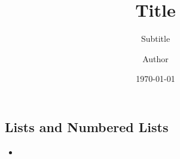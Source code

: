 \documentclass[
	aspectratio=169, %
	8pt, %
]{beamer}
\title[Short Title]{Title} %
\subtitle[Short Subtitle]{Subtitle} %
\author[Short Author]{Author} %
\date{\today} %
\begin{document}
\maketitle %

\subsection{Lists and Numbered Lists}
\begin{frame}[t]{\insertsubsection}
	\begin{itemize}
		\item 
	\end{itemize}
\end{frame}
\end{document}

